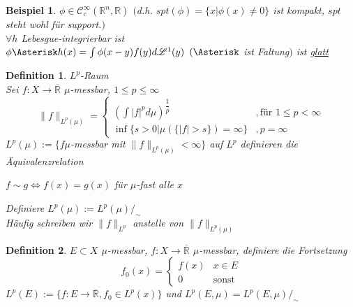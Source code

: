\documentclass[11pt]{memoir}
\theoremstyle{changebreak}
\newtheorem{Definition}{Definition}[chapter]
\newtheorem{Beispiel}{Beispiel}[chapter]
\begin{document}
\begin{Beispiel}
$\phi \in \mathscr C_c^\infty(\mathbb R^n, \mathbb R)$ $($d.h. $spt(\phi) =\{x| \phi(x) \ne 0\}$ ist kompakt, $spt$ steht wohl für support.$)$  \\
$\forall h$ Lebesgue-integrierbar ist \\
$\phi \Asterisk h(x) = \int \phi(x-y)f(y) d\mathscr L^1(y)$ $(\Asterisk$ ist \emph{Faltung}$)$ ist \underline{glatt}
\end{Beispiel}


\begin{Definition}
\emph{$L^p$-Raum} \\
Sei $f: X \rightarrow \overline{\mathbb R}$ $\mu$-messbar, $1 \leq p \leq \infty$ \\
\begin{equation}
\|f\|_{L^p (\mu)} =
\begin{cases}
	\left( \int |f|^p d\mu\right) ^{\dfrac{1}{p}} & , \text{für } 1 \leq p < \infty \\
	\inf \{s > 0 | \mu(\{|f| > s\}) = \infty \} & , p = \infty
\end{cases}
\end{equation}
$L^p(\mu):= \{f \mu$-messbar mit $\|f\|_{L^p (\mu)} < \infty\}$ auf $L^p$ definieren die Äquivalenzrelation
\begin{center}
	$f \sim g \Leftrightarrow f(x) = g(x)$ für $\mu$-fast alle $x$
\end{center}
Definiere $L^p(\mu) := L^p(\mu) /_\sim$ \\
Häufig schreiben wir $\|f\|_{L^p}$ anstelle von $\|f\|_{L^p (\mu)}$
\end{Definition}

\begin{Definition}
$E \subset X$ $\mu$-messbar, $f: X \rightarrow \overline{\mathbb R}$ $\mu$-messbar, definiere die Fortsetzung
\begin{equation}
f_0(x) =
\begin{cases}
	f(x) & x \in E \\
	0 & \text{sonst}
\end{cases}
\end{equation}
$L^p(E) := \{f: E \rightarrow \overline{\mathbb R}, f_0 \in L^p(x)\}$ und $L^p(E, \mu) = L^p(E, \mu)/_\sim$
\end{Definition}
\end{document}
